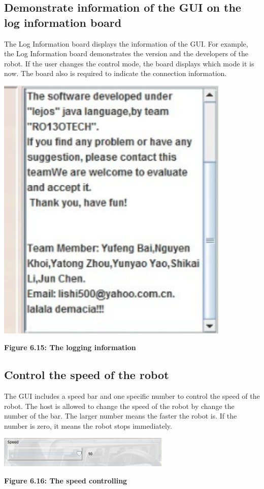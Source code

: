\documentclass[11pt, a4paper]{report}
\begin{document}
\subsection{Demonstrate information of the GUI on the log information board}
The Log Information board displays the information of the GUI. For example, the Log Information board demonstrates the version and the developers of the robot. If the user changes the control mode, the board displays which mode it is now. The board also is required to indicate the connection information.
  \begin{center}
 \includegraphics[width=11.20cm]{board}
\end{center}
\begin{center}
\textbf {Figure 6.15: The logging information} \\[0.3cm]
\end{center}
\subsection{Control the speed of the robot}
The GUI includes a speed bar and one specific number to control the speed of the robot. The host is allowed to change the speed of the robot by change the number of the bar. The larger number means the faster the robot is. If the number is zero, it means the robot stops immediately.
  \begin{center}
 \includegraphics[width=8.20cm]{bar}
\end{center}
\begin{center}
\textbf {Figure 6.16: The speed controlling} \\[0.3cm]
\end{center}
\end{document}
